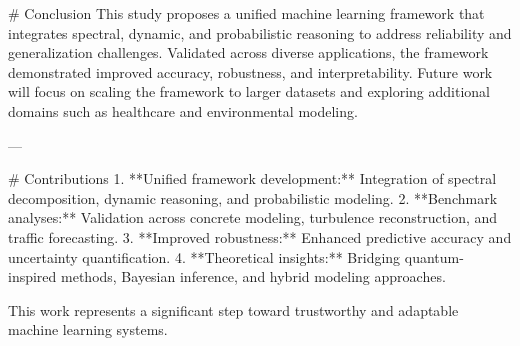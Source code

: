 # Conclusion  
This study proposes a unified machine learning framework that integrates spectral, dynamic, and probabilistic reasoning to address reliability and generalization challenges. Validated across diverse applications, the framework demonstrated improved accuracy, robustness, and interpretability. Future work will focus on scaling the framework to larger datasets and exploring additional domains such as healthcare and environmental modeling.

---

# Contributions  
1. **Unified framework development:** Integration of spectral decomposition, dynamic reasoning, and probabilistic modeling.
2. **Benchmark analyses:** Validation across concrete modeling, turbulence reconstruction, and traffic forecasting.
3. **Improved robustness:** Enhanced predictive accuracy and uncertainty quantification.
4. **Theoretical insights:** Bridging quantum-inspired methods, Bayesian inference, and hybrid modeling approaches.

This work represents a significant step toward trustworthy and adaptable machine learning systems.